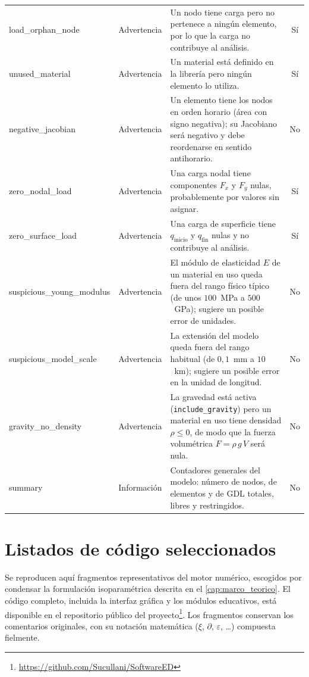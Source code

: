 \begin{longtable}{@{}>{\ttfamily\footnotesize}p{2.8cm} >{\footnotesize}l >{\footnotesize\raggedright\arraybackslash}p{5.4cm} >{\footnotesize}c@{}}
load\_orphan\_node & Advertencia & Un nodo tiene carga pero no pertenece a ningún elemento, por lo que la carga no contribuye al análisis. & Sí \\
\addlinespace
unused\_material & Advertencia & Un material está definido en la librería pero ningún elemento lo utiliza. & Sí \\
\addlinespace
negative\_jacobian & Advertencia & Un elemento tiene los nodos en orden horario (área con signo negativa); su Jacobiano será negativo y debe reordenarse en sentido antihorario. & No \\
\addlinespace
zero\_nodal\_load & Advertencia & Una carga nodal tiene componentes $F_x$ y $F_y$ nulas, probablemente por valores sin asignar. & Sí \\
\addlinespace
zero\_surface\_load & Advertencia & Una carga de superficie tiene $q_{\text{inicio}}$ y $q_{\text{fin}}$ nulas y no contribuye al análisis. & Sí \\
\addlinespace
suspicious\_young\_modulus & Advertencia & El módulo de elasticidad $E$ de un material en uso queda fuera del rango físico típico (de unos \mbox{$100$~MPa} a \mbox{$500$~GPa}); sugiere un posible error de unidades. & No \\
\addlinespace
suspicious\_model\_scale & Advertencia & La extensión del modelo queda fuera del rango habitual (de \mbox{$0{,}1$~mm} a \mbox{$10$~km}); sugiere un posible error en la unidad de longitud. & No \\
\addlinespace
gravity\_no\_density & Advertencia & La gravedad está activa (\texttt{include\_gravity}) pero un material en uso tiene densidad $\rho \le 0$, de modo que la fuerza volumétrica $F = \rho\, g\, V$ será nula. & No \\
\midrule

summary & Información & Contadores generales del modelo: número de nodos, de elementos y de GDL totales, libres y restringidos. & No \\

\end{longtable}



\chapter{Listados de código seleccionados}
\label{anexo:codigo}

Se reproducen aquí fragmentos representativos del motor numérico, escogidos por condensar la formulación isoparamétrica descrita en el \autoref{cap:marco_teorico}. El código completo, incluida la interfaz gráfica y los módulos educativos, está disponible en el repositorio público del proyecto\footnote{\url{https://github.com/Sucullani/SoftwareED}}. Los fragmentos conservan los comentarios originales, con su notación matemática ($\xi$, $\partial$, $\varepsilon$, \dots) compuesta fielmente.

